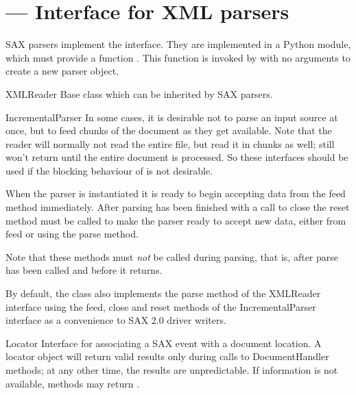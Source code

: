 \section{ ---
         Interface for XML parsers}




SAX parsers implement the  interface. They are
implemented in a Python module, which must provide a function
. This function is invoked by 
 with no arguments to create a new 
parser object.

\begin{classdesc}{XMLReader}{}
  Base class which can be inherited by SAX parsers.
\end{classdesc}

\begin{classdesc}{IncrementalParser}{}
  In some cases, it is desirable not to parse an input source at once,
  but to feed chunks of the document as they get available. Note that
  the reader will normally not read the entire file, but read it in
  chunks as well; still  won't return until the entire
  document is processed. So these interfaces should be used if the
  blocking behaviour of  is not desirable.

  When the parser is instantiated it is ready to begin accepting data
  from the feed method immediately. After parsing has been finished
  with a call to close the reset method must be called to make the
  parser ready to accept new data, either from feed or using the parse
  method.

  Note that these methods must \emph{not} be called during parsing,
  that is, after parse has been called and before it returns.

  By default, the class also implements the parse method of the
  XMLReader interface using the feed, close and reset methods of the
  IncrementalParser interface as a convenience to SAX 2.0 driver
  writers.
\end{classdesc}

\begin{classdesc}{Locator}{}
  Interface for associating a SAX event with a document location. A
  locator object will return valid results only during calls to
  DocumentHandler methods; at any other time, the results are
  unpredictable. If information is not available, methods may return
  .
\end{classdesc}


